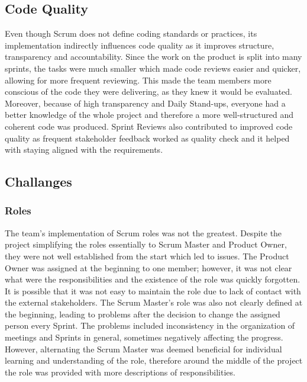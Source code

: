 \subsection*{Code Quality}
Even though Scrum does not define coding standards or practices, its implementation indirectly influences code quality as it improves structure, transparency and accountability. Since the work on the product is split into many sprints, the tasks were much smaller which made code reviews easier and quicker, allowing for more frequent reviewing. This made the team members more conscious of the code they were delivering, as they knew it would be evaluated. Moreover, because of high transparency and Daily Stand-ups, everyone had a better knowledge of the whole project and therefore a more well-structured and coherent code was produced. Sprint Reviews also contributed to improved code quality as frequent stakeholder feedback worked as quality check and it helped with staying aligned with the requirements.

\subsection*{Challanges}
\subsubsection*{Roles}
The team's implementation of Scrum roles was not the greatest. Despite the project simplifying the roles essentially to Scrum Master and Product Owner, they were not well established from the start which led to issues. The Product Owner was assigned at the beginning to one member; however, it was not clear what were the responsibilities and the existence of the role was quickly forgotten. It is possible that it was not easy to maintain the role due to lack of contact with the external stakeholders. The Scrum Master's role was also not clearly defined at the beginning, leading to problems after the decision to change the assigned person every Sprint. The problems included inconsistency in the organization of meetings and Sprints in general, sometimes negatively affecting the progress. However, alternating the Scrum Master was deemed beneficial for individual learning and understanding of the role, therefore around the middle of the project the role was provided with more descriptions of responsibilities.
